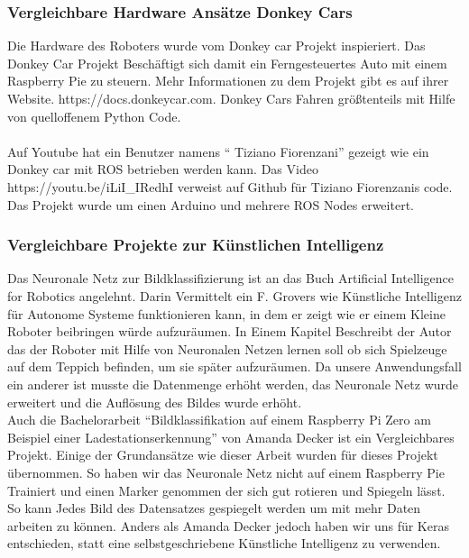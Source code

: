 \documentclass[conference]{IEEEtran}
\begin{document}
	
	\subsubsection{Vergleichbare Hardware Ansätze Donkey Cars} %
	Die Hardware des Roboters wurde vom Donkey car Projekt inspieriert. Das Donkey Car Projekt Beschäftigt sich damit ein Ferngesteuertes Auto mit einem Raspberry Pie zu steuern. Mehr Informationen zu dem Projekt gibt es auf ihrer Website. https://docs.donkeycar.com.  Donkey Cars Fahren größtenteils mit Hilfe von quelloffenem Python Code. \\
	\\
	Auf Youtube hat ein Benutzer namens "` Tiziano Fiorenzani"' gezeigt wie ein Donkey car mit ROS betrieben werden kann. Das Video https://youtu.be/iLiI\_IRedhI verweist auf Github für Tiziano Fiorenzanis code. Das Projekt wurde um einen Arduino und mehrere ROS Nodes erweitert.
	\subsubsection{Vergleichbare Projekte zur Künstlichen Intelligenz} %
	
	Das Neuronale Netz zur Bildklassifizierung ist an das Buch  Artificial Intelligence for Robotics  \cite{b1} angelehnt. Darin Vermittelt ein F. Grovers wie Künstliche Intelligenz für Autonome Systeme  funktionieren kann, in dem er zeigt wie er einem Kleine Roboter beibringen würde aufzuräumen. In Einem Kapitel Beschreibt der Autor das der Roboter mit Hilfe von Neuronalen Netzen lernen soll ob sich Spielzeuge auf dem Teppich befinden, um sie später aufzuräumen.  Da unsere Anwendungsfall ein anderer ist  musste die Datenmenge erhöht werden, das Neuronale Netz wurde erweitert und die Auflösung des Bildes wurde erhöht.\\
	
	Auch die Bachelorarbeit  "`Bildklassifikation auf einem Raspberry Pi Zero
	am Beispiel einer Ladestationserkennung"'  von Amanda Decker ist ein Vergleichbares Projekt.  Einige der Grundansätze wie  dieser Arbeit wurden für dieses Projekt übernommen. So haben wir das Neuronale Netz nicht auf einem Raspberry Pie Trainiert und einen Marker genommen der sich gut rotieren und Spiegeln lässt. So kann Jedes Bild des Datensatzes gespiegelt werden um mit mehr Daten arbeiten zu können. Anders als Amanda Decker jedoch haben wir uns für Keras entschieden, statt eine selbstgeschriebene Künstliche Intelligenz zu verwenden. 
\end{document}
